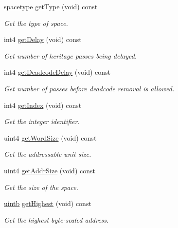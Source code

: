 \begin{DoxyCompactItemize}
\mbox{\hyperlink{space_8hh_a1a83535cca68b7ca3f25bfad70262231}{spacetype}} \mbox{\hyperlink{class_addr_space_ab548f4158529a29122d4d0a30d94ed98}{get\+Type}} (void) const
\begin{DoxyCompactList}\small\item\em Get the type of space. \end{DoxyCompactList}\item 
int4 \mbox{\hyperlink{class_addr_space_a63b510a07fd8450dc432d7e671f79f66}{get\+Delay}} (void) const
\begin{DoxyCompactList}\small\item\em Get number of heritage passes being delayed. \end{DoxyCompactList}\item 
int4 \mbox{\hyperlink{class_addr_space_a51295f26c99891cb310af0eb0c20d4db}{get\+Deadcode\+Delay}} (void) const
\begin{DoxyCompactList}\small\item\em Get number of passes before deadcode removal is allowed. \end{DoxyCompactList}\item 
int4 \mbox{\hyperlink{class_addr_space_abac46fe0121579ac29f2e8e93753183d}{get\+Index}} (void) const
\begin{DoxyCompactList}\small\item\em Get the integer identifier. \end{DoxyCompactList}\item 
uint4 \mbox{\hyperlink{class_addr_space_ab84baa41a0b25735578129031fef550c}{get\+Word\+Size}} (void) const
\begin{DoxyCompactList}\small\item\em Get the addressable unit size. \end{DoxyCompactList}\item 
uint4 \mbox{\hyperlink{class_addr_space_aa4217d683f1de141406d009dc4364874}{get\+Addr\+Size}} (void) const
\begin{DoxyCompactList}\small\item\em Get the size of the space. \end{DoxyCompactList}\item 
\mbox{\hyperlink{types_8h_a2db313c5d32a12b01d26ac9b3bca178f}{uintb}} \mbox{\hyperlink{class_addr_space_ab4c316eafd39b4e6c7a8017e01d5a841}{get\+Highest}} (void) const
\begin{DoxyCompactList}\small\item\em Get the highest byte-\/scaled address. \end{DoxyCompactList}\item 

\end{DoxyCompactItemize}
